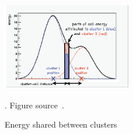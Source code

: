 \begin{figure}[t!]
\centering
\includegraphics[width=0.50\textwidth]{figures/energy_sharing.png}
\caption[Energy shared between clusters]{Energy shared between clusters}. Figure source~\cite{SMtable}.                                                            
\label{fig:clustering}                                                                                                               
\end{figure}
